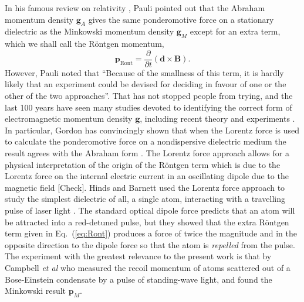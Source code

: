 In his famous review on relativity \cite{pauli}, Pauli pointed out that the Abraham momentum density $\mathbf{g}_{A}$ gives the same ponderomotive force on a stationary dielectric as the Minkowski momentum density $\mathbf{g}_{M}$ except for an extra term, which we shall call the R\"{o}ntgen momentum,
\begin{equation}
\mathbf{p}_{\mathrm{Ront}}= \frac{\partial}{\partial t} (\mathbf{d} \times \mathbf{B} ) .
\label{eq:Ront}
\end{equation}
However, Pauli noted that ``Because of the smallness of this term, it is hardly likely that an experiment could be devised for deciding in favour of one or the other of the two approaches''. That has not stopped people from trying, and the last 100 years have seen many studies devoted to identifying the correct form of electromagnetic momentum density $\mathbf{g}$, including recent theory and experiments  \cite{Gordon73,chiao,Loudon05,ketterle,feng,mansuripur,hinds09,barnett10}. In particular, Gordon has convincingly shown that when the Lorentz force is used to calculate the ponderomotive force on a nondispersive dielectric medium the result agrees with the Abraham form \cite{Gordon73}. The Lorentz force approach allows for a physical interpretation of the origin of the R\"{o}ntgen term which is due to the Lorentz force on the internal electric current in an oscillating dipole due to the magnetic field [Check]. Hinds and Barnett used the Lorentz force approach to study the simplest dielectric of all, a single atom, interacting with a travelling pulse of laser light \cite{hinds09}. The standard optical dipole force predicts that an atom will be attracted into a red-detuned pulse, but they showed that the extra R\"{o}ntgen term given in Eq.\ (\ref{eq:Ront}) produces a force of twice the magnitude and in the opposite direction to the dipole force so that the atom is \emph{repelled} from the pulse. The experiment with the greatest relevance to the present work is that by Campbell \emph{et al} \cite{ketterle} who measured the recoil momentum of atoms scattered out of a Bose-Einstein condensate by a pulse of standing-wave light, and found the Minkowski result $\mathbf{p}_M$. 

